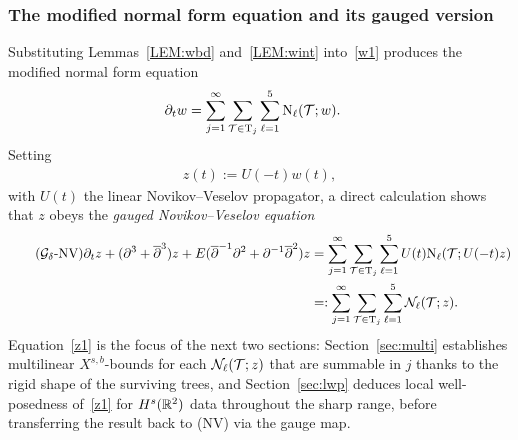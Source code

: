 \subsubsection*{The modified normal form equation and its gauged version}

Substituting Lemmas~\ref{LEM:wbd} and~\ref{LEM:wint} into~\eqref{w1} produces the modified normal form equation
\begin{align}
\label{w2}
\partial_t w & =  \sum_{j=1}^\infty \sum_{\mathcal{T} \in \mathrm{T}_j} \sum_{\ell=1}^5  \mathrm{N}_\ell(\mathcal{T};w).
\end{align}
Setting
\begin{align}
\label{z0}
z(t) := U(-t) w(t),
\end{align}
with $U(t)$ the linear Novikov--Veselov propagator, a direct calculation shows that $z$ obeys the \emph{gauged Novikov--Veselov equation}
\begin{align}
\label{z1}\tag{$\mathcal{G}_\delta$-NV}
\dt z + (\partial^3+\overline{\partial}^3)z + E(\overline{\partial}^{-1}\partial^2 + \partial^{-1}\overline{\partial}^2)z
&= \sum_{j=1}^\infty \sum_{\TT \in \Tr_j} \sum_{\l=1}^5  U(t) \NN_\l(\TT;U(-t)z)
\nonumber\\
&=: \sum_{j=1}^\infty \sum_{\TT \in \Tr_j} \sum_{\l=1}^5  \Ncal_\l(\TT;z).
\end{align}
Equation~\eqref{z1} is the focus of the next two sections: Section~\ref{sec:multi} establishes multilinear $X^{s,b}$-bounds for each $\mathcal{N}_\ell(\mathcal{T};z)$ that are summable in $j$ thanks to the rigid shape of the surviving trees, and Section~\ref{sec:lwp} deduces local well-posedness of~\eqref{z1} for $H^s(\mathbb{R}^2)$ data throughout the sharp range, before transferring the result back to (NV) via the gauge map.
